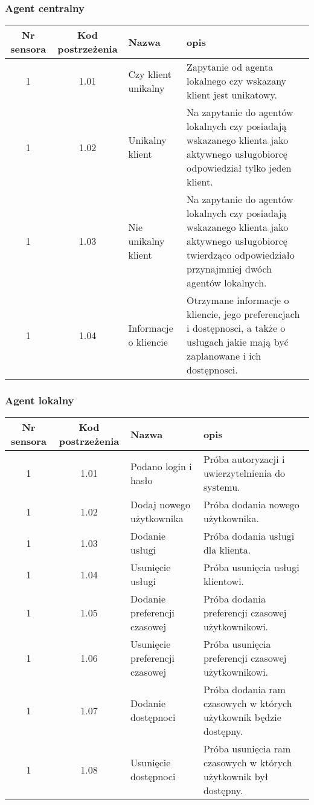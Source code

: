 \subsubsection{Agent centralny}

\begin{tabular}{c|c|p{3cm}|p{5cm}}
Nr sensora & Kod postrzeżenia & Nazwa & opis\\
\hline
1 & 1.01 & Czy klient unikalny & Zapytanie od agenta lokalnego czy wskazany klient jest unikatowy.\\
1 & 1.02 & Unikalny klient & Na zapytanie do agentów lokalnych czy posiadają wskazanego klienta jako aktywnego usługobiorcę odpowiedział tylko jeden klient.\\
1 & 1.03 & Nie unikalny klient & Na zapytanie do agentów lokalnych czy posiadają wskazanego klienta jako aktywnego usługobiorcę twierdząco odpowiedziało przynajmniej dwóch agentów lokalnych.\\
1 & 1.04 & Informacje o kliencie & Otrzymane informacje o kliencie, jego preferencjach i dostępnosci, a także o usługach jakie mają być zaplanowane i ich dostępnosci.\\
\end{tabular}

\subsubsection{Agent lokalny}

\begin{tabular}{c|c|p{3cm}|p{5cm}}
Nr sensora & Kod postrzeżenia & Nazwa & opis\\
\hline
1 & 1.01 & Podano login i hasło & Próba autoryzacji i uwierzytelnienia do systemu.\\
1 & 1.02 & Dodaj nowego użytkownika & Próba dodania nowego użytkownika.\\
1 & 1.03 & Dodanie usługi & Próba dodania usługi dla klienta.\\
1 & 1.04 & Usunięcie usługi & Próba usunięcia usługi klientowi.\\
1 & 1.05 & Dodanie preferencji czasowej & Próba dodania preferencji czasowej użytkownikowi.\\
1 & 1.06 & Usunięcie preferencji czasowej & Próba usunięcia preferencji czasowej użytkownikowi.\\
1 & 1.07 & Dodanie dostępnoci & Próba dodania ram czasowych w których użytkownik będzie dostępny.\\
1 & 1.08 & Usunięcie dostępnoci & Próba usunięcia ram czasowych w których użytkownik był dostępny.\\
\end{tabular}

